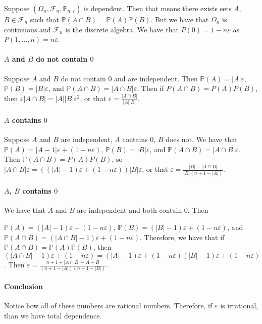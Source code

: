 \documentclass{article}
\theoremstyle{definition}
\numberwithin{theorem}{section}
\numberwithin{equation}{section}
\begin{document}
\par
Suppose $(\Omega_n, \mathcal{F}_n, \mathbb{P}_{n, \varepsilon})$ is dependent. Then that means there exists sets $A$, $B \in \mathcal{F}_n$ such that $\mathbb{P}(A \cap B) = \mathbb{P}(A) \mathbb{P}(B)$. But we have that $\Omega_n$ is continuous and $\mathcal{F}_n$ is the discrete algebra. We have that $P(0) = 1 - n\varepsilon$ as $P({1, ..., n}) = n \varepsilon$. 

\paragraph{$A$ and $B$ do not contain $0$}
Suppose $A$ and $B$ do not contain $0$ and are independent. Then $\mathbb{P}(A) = |A| \varepsilon$, $\mathbb{P}(B) = |B| \varepsilon$, and $\mathbb{P}(A \cap B) = |A \cap B| \varepsilon$. Then if $P(A \cap B) = P(A) P(B)$, then $\varepsilon |A \cap B| = |A| |B| \varepsilon^2$, or that $\varepsilon = \frac{|A \cap B|}{|A| |B|}$. 

\paragraph{$A$ contains $0$}
Suppose $A$ and $B$ are independent, $A$ contains $0$, $B$ does not. 
We have that $\mathbb{P}(A) = |A - 1| \varepsilon + (1 - n \varepsilon)$, $\mathbb{P}(B) = |B| \varepsilon$, and $\mathbb{P}(A \cap B) = |A \cap B| \varepsilon$. Then $\mathbb{P}(A \cap B) = P(A) P(B)$, so $ |A \cap B| \varepsilon = ((|A| - 1) \varepsilon + (1 - n \varepsilon))|B| \varepsilon$, or that $\varepsilon = \frac{|B| - |A \cap B|}{|B|(n + 1 - |A|)}$. 

\paragraph{$A$, $B$ contains $0$}
We have that $A$ and $B$ are independent and both contain $0$. Then 

$\mathbb{P}(A) = (|A| - 1) \varepsilon + (1 - n \varepsilon)$, $\mathbb{P}(B) = (|B| - 1) \varepsilon + (1 - n \varepsilon)$, and $\mathbb{P}(A \cap B) = (|A \cap B| - 1) \varepsilon + (1 - n \varepsilon)$. Therefore, we have that if $\mathbb{P}(A \cap B) = \mathbb{P}(A)\mathbb{P}(B)$, then $(|A \cap B| - 1) \varepsilon + (1 - n \varepsilon) = (|A| - 1) \varepsilon + (1 - n \varepsilon)(|B| - 1) \varepsilon + (1 - n \varepsilon)$. Then $\varepsilon = \frac{n + 1 + |A \cap B| - A - B}{(n + 1 - |A|)(n + 1 - |B|)}$.
\paragraph{Conclusion}
Notice how all of these numbers are rational numbers. Therefore, if $\varepsilon$ is irrational, than we have total dependence.
\end{document}

